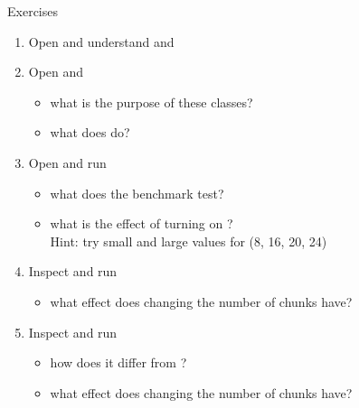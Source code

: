 \documentclass[aspectratio=43]{beamer}
\begin{document}
\begin{frame}[fragile]{Exercises}
    \begin{enumerate}
        \item Open  and understand  and 

        \item Open  and 
        \begin{itemize}
            \item what is the purpose of these classes?
            \item what does  do?
        \end{itemize}

        \item Open  and run
        \begin{itemize}
            \item what does the benchmark test?
            \item what is the effect of turning on ?\\Hint: try small and large values for  (8, 16, 20, 24)
        \end{itemize}

        \item Inspect  and run
        \begin{itemize}
            \item what effect does changing the number of chunks have?
        \end{itemize}

        \item Inspect  and run
        \begin{itemize}
            \item how does it differ from ?
            \item what effect does changing the number of chunks have?
        \end{itemize}
    \end{enumerate}
\end{frame}
\end{document}
